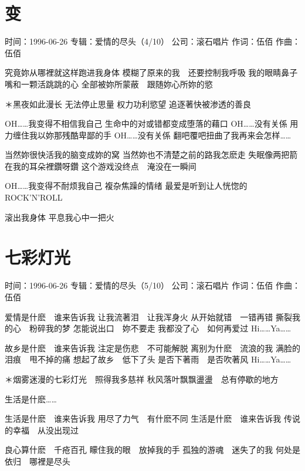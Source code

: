 \documentclass[UTF8,a4paper,oneside,twocolumn,12pt]{ctexbook}
\newcommand{\infopair}[2]{\textbullet #1：#2}
\newcommand{\zc}[1][伍佰]{\infopair{作词}{#1}}
\newcommand{\zq}[1][伍佰]{\infopair{作曲}{#1}}
\newcommand{\zj}[1]{\infopair{专辑}{#1}}
\newcommand{\sj}[1]{\infopair{时间}{#1}}
\newcommand{\gs}[1]{\infopair{公司}{#1}}
\newenvironment{info}{\begin{flushleft}\kaishu
	}
	{\end{flushleft}\normalsize\yahei\par}
\newenvironment{lyric}{
	}
{}
\begin{document}
\section{变}
\begin{info}
	\sj{1996-06-26}
	\zj{爱情的尽头（4/10）}
	\gs{滚石唱片}
	\zc
	\zq
\end{info}
\begin{lyric}
	究竟妳从哪裡就这样跑进我身体
	模糊了原来的我　还要控制我呼吸
	我的眼睛鼻子嘴和一颗活跳跳的心
	全部被妳所蒙蔽　跟随妳心所妳的慾

	＊黑夜如此漫长
	无法停止思量
	权力功利慾望
	追逐著快被渗透的善良

	OH……我变得不相信我自己
	生命中的对或错都变成堕落的藉口
	OH……没有关係
	用力缠住我以妳那残酷卑鄙的手
	OH……没有关係
	翻吧覆吧扭曲了我再来会怎样……

	当然妳很快活我的脑变成妳的窝
	当然妳也不清楚之前的路我怎麽走
	失眠像两把箭在我的耳朵裡鑽呀鑽
	这个游戏没终点　淹没在一瞬间

	OH……我变得不耐烦我自己
	複杂焦躁的情绪
	最爱是听到让人恍惚的ROCK'N'ROLL

	滚出我身体
	平息我心中一把火
\end{lyric}

\section{七彩灯光}
\begin{info}
	\sj{1996-06-26}
	\zj{爱情的尽头（5/10）}
	\gs{滚石唱片}
	\zc
	\zq
\end{info}
\begin{lyric}
	爱情是什麽　谁来告诉我
	让我流著泪　让我浑身火
	从开始就错　一错再错
	撕裂我的心　粉碎我的梦
	怎能说出口　妳不要走
	我都没了心　如何再爱过
	Hi……Ya……

	故乡是什麽　谁来告诉我
	注定是伤悲　不可能解脱
	离别为什麽　流浪的我
	满脸的泪痕　甩不掉的痛
	想起了故乡　低下了头
	是否下著雨　是否吹著风
	Hi……Ya……

	＊烟雾迷漫的七彩灯光　照得我多慈祥
	秋风落叶飘飘盪盪　总有停歇的地方

	生活是什麽……

	生活是什麽　谁来告诉我
	用尽了力气　有什麽不同
	生活是什麽　谁来告诉我
	传说的幸福　从没出现过

	良心算什麽　千疮百孔
	矇住我的眼　放掉我的手
	孤独的游魂　迷失了的我
	何处是依归　哪裡是尽头
\end{lyric}
\end{document}

